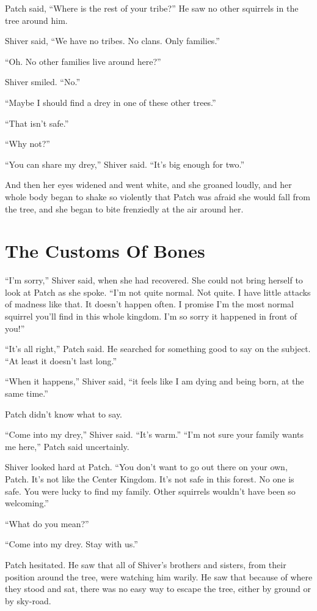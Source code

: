\documentclass[ebook,oneside,openany,17pt]{memoir}
\renewcommand{\thechapter}{\Roman{chapter}}
\newcounter{sections}
\newcommand{\sections}[1]{%
  \section*{#1}
  \addtocounter{sections}{1}%
  \pdfbookmark[1]{#1}{section.\thechapter.\thesections}}
\begin{document}
Patch said, “Where is the rest of your tribe?” He saw no other
squirrels in the tree around him.

Shiver said, “We have no tribes. No clans. Only families.”

“Oh. No other families live around here?”

Shiver smiled. “No.”

“Maybe I should find a drey in one of these other trees.”

“That isn’t safe.”

“Why not?”

“You can share my drey,” Shiver said. “It’s big enough for two.”

And then her eyes widened and went white, and she groaned loudly, and
her whole body began to shake so violently that Patch was afraid she
would fall from the tree, and she began to bite frenziedly at the air
around her.


\sections{The Customs Of Bones}

“I’m sorry,” Shiver said, when she had recovered. She could not bring
herself to look at Patch as she spoke. “I’m not quite normal. Not
quite. I have little attacks of madness like that. It doesn’t happen
often. I promise I’m the most normal squirrel you’ll find in this
whole kingdom. I’m so sorry it happened in front of you!”

“It’s all right,” Patch said. He searched for something good to say on
the subject. “At least it doesn’t last long.”

“When it happens,” Shiver said, “it feels like I am dying and being
born, at the same time.”

Patch didn’t know what to say.

“Come into my drey,” Shiver said. “It’s warm.” “I’m not sure your
family wants me here,” Patch said uncertainly.

Shiver looked hard at Patch. “You don’t want to go out there on your
own, Patch. It’s not like the Center Kingdom. It’s not safe in this
forest. No one is safe. You were lucky to find my family. Other
squirrels wouldn’t have been so welcoming.”

“What do you mean?”

“Come into my drey. Stay with us.”

Patch hesitated. He saw that all of Shiver’s brothers and sisters,
from their position around the tree, were watching him warily. He saw
that because of where they stood and sat, there was no easy way to
escape the tree, either by ground or by sky-road.
\end{document}

